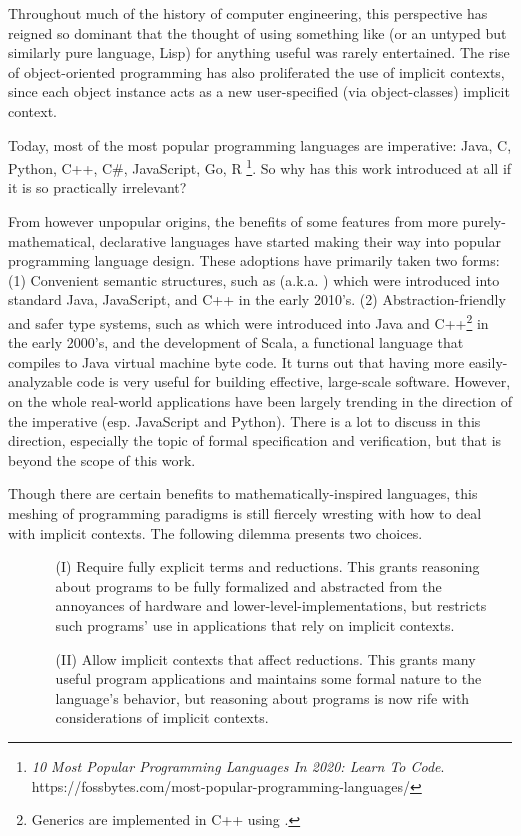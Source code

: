 Throughout much of the history of computer engineering, this perspective has reigned so dominant that the thought of using something like \LangA (or an untyped but similarly pure language, Lisp) for anything useful was rarely entertained.
The rise of object-oriented programming has also proliferated the use of implicit contexts, since each object instance acts as a new user-specified (via object-classes) implicit context.

Today, most of the most popular programming languages are imperative:
Java, C, Python, C++, C\#, JavaScript, Go, R%
\footnote{\textit{10 Most Popular Programming Languages In 2020: Learn To Code}. https://fossbytes.com/most-popular-programming-languages/}.
So why has this work introduced \LangA at all if it is so practically irrelevant?

From however unpopular origins, the benefits of some features from more purely-mathematical, declarative languages have started making their way into popular programming language design.
These adoptions have primarily taken two forms:
(1) Convenient semantic structures, such as  (a.k.a. ) which were introduced into standard Java, JavaScript, and C++ in the early 2010's.
(2) Abstraction-friendly and safer type systems, such as  which were introduced into Java and C++\footnote{Generics are implemented in C++ using .} in the early 2000's, and the development of Scala, a functional language that compiles to Java virtual machine byte code.
It turns out that having more easily-analyzable code is very useful for building effective, large-scale software.
However, on the whole real-world applications have been largely trending in the direction of the imperative (esp. JavaScript and Python).
There is a lot to discuss in this direction, especially the topic of formal specification and verification, but that is beyond the scope of this work.

Though there are certain benefits to mathematically-inspired languages, this meshing of programming paradigms is still fiercely wresting with how to deal with implicit contexts.
The following dilemma presents two choices.

\begin{itemize}
\item[] 
\begin{enumerate}
\item[(I)]
Require fully explicit terms and reductions.
This grants reasoning about programs to be fully formalized and abstracted from the annoyances of hardware and lower-level-implementations,
but restricts such programs' use in applications that rely on implicit contexts.
\item[(II)]
Allow implicit contexts that affect reductions.
This grants many useful program applications and maintains some formal nature to the language's behavior,
but reasoning about programs is now rife with considerations of implicit contexts.
\end{enumerate}
\end{itemize}

